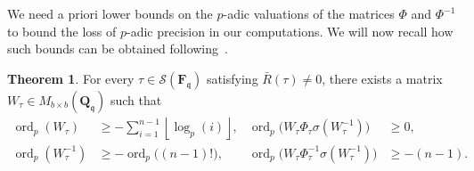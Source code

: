 \documentclass[a4paper,11pt]{article}
\numberwithin{equation}{section}
\providecommand{\floor}[1]{\left\lfloor#1\right\rfloor}   %
\newcommand{\QQ}{\mathbf{Q}} %
\newcommand{\FF}{\mathbf{F}} %
\DeclareMathOperator{\ord}{ord}          %
\theoremstyle{definition}
\newtheorem{thm}{Theorem}[section]
\begin{document}
We need a priori lower bounds on the $p$-adic valuations of the matrices 
$\Phi$ and $\Phi^{-1}$ to bound the loss of $p$-adic precision in our 
computations. We will now recall how such bounds can be obtained 
following~\citep{AbbottKedlayaRoe2006}.

\begin{thm} \label{thm:deltabound}
For every 
$\tau \in \mathcal{S}(\FF_{\mathfrak{q}})$ satisfying $\bar{R}(\tau) \neq 0$, 
there exists a matrix $W_{\tau} \in M_{b \times b}(\QQ_{\mathfrak{q}})$ such that 
\begin{align*}
\ord_p(W_{\tau}) &\geq -\sum_{i=1}^{n-1} \floor{\log_p(i)},
&\ord_p\bigl(W_{\tau} \Phi_{\tau} \sigma(W_{\tau}^{-1})\bigr) &\geq  0, \\
\ord_p(W_{\tau}^{-1}) &\geq -\ord_p \bigl((n-1)! \bigr),
&\ord_p\bigl(W_{\tau} \Phi_{\tau}^{-1} \sigma(W_{\tau}^{-1})\bigr) &\geq  -(n-1).
\end{align*}
\end{thm}
\end{document}
